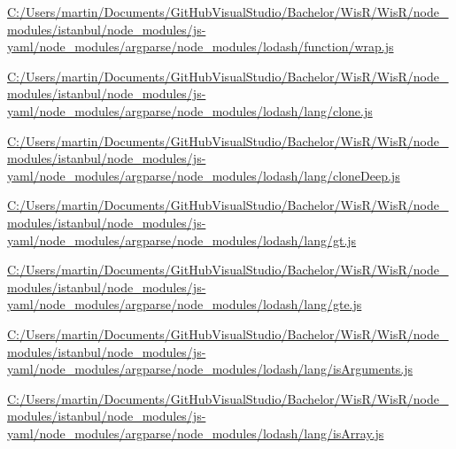 \begin{DoxyCompactItemize}
\item 
\hyperlink{_c_1_2_users_2martin_2_documents_2_git_hub_visual_studio_2_bachelor_2_wis_r_2_wis_r_2node_module78f187cbb354b52bc415f19efb84d83c}{C\+:/\+Users/martin/\+Documents/\+Git\+Hub\+Visual\+Studio/\+Bachelor/\+Wis\+R/\+Wis\+R/node\+\_\+modules/istanbul/node\+\_\+modules/js-\/yaml/node\+\_\+modules/argparse/node\+\_\+modules/lodash/function/wrap.\+js}
\item 
\hyperlink{_c_1_2_users_2martin_2_documents_2_git_hub_visual_studio_2_bachelor_2_wis_r_2_wis_r_2node_modulebd4a8145bed9da1f1f4712507570fd4c}{C\+:/\+Users/martin/\+Documents/\+Git\+Hub\+Visual\+Studio/\+Bachelor/\+Wis\+R/\+Wis\+R/node\+\_\+modules/istanbul/node\+\_\+modules/js-\/yaml/node\+\_\+modules/argparse/node\+\_\+modules/lodash/lang/clone.\+js}
\item 
\hyperlink{_c_1_2_users_2martin_2_documents_2_git_hub_visual_studio_2_bachelor_2_wis_r_2_wis_r_2node_modulefd1acf0c48ee2a338bb1349107fbb9a1}{C\+:/\+Users/martin/\+Documents/\+Git\+Hub\+Visual\+Studio/\+Bachelor/\+Wis\+R/\+Wis\+R/node\+\_\+modules/istanbul/node\+\_\+modules/js-\/yaml/node\+\_\+modules/argparse/node\+\_\+modules/lodash/lang/clone\+Deep.\+js}
\item 
\hyperlink{_c_1_2_users_2martin_2_documents_2_git_hub_visual_studio_2_bachelor_2_wis_r_2_wis_r_2node_module264da62225d2a5ed5814648b89ed2255}{C\+:/\+Users/martin/\+Documents/\+Git\+Hub\+Visual\+Studio/\+Bachelor/\+Wis\+R/\+Wis\+R/node\+\_\+modules/istanbul/node\+\_\+modules/js-\/yaml/node\+\_\+modules/argparse/node\+\_\+modules/lodash/lang/gt.\+js}
\item 
\hyperlink{_c_1_2_users_2martin_2_documents_2_git_hub_visual_studio_2_bachelor_2_wis_r_2_wis_r_2node_modulef5abe034b9ab1fcf26552468791610d6}{C\+:/\+Users/martin/\+Documents/\+Git\+Hub\+Visual\+Studio/\+Bachelor/\+Wis\+R/\+Wis\+R/node\+\_\+modules/istanbul/node\+\_\+modules/js-\/yaml/node\+\_\+modules/argparse/node\+\_\+modules/lodash/lang/gte.\+js}
\item 
\hyperlink{_c_1_2_users_2martin_2_documents_2_git_hub_visual_studio_2_bachelor_2_wis_r_2_wis_r_2node_modulee8a43435dff201322bd451c9cbe6b122}{C\+:/\+Users/martin/\+Documents/\+Git\+Hub\+Visual\+Studio/\+Bachelor/\+Wis\+R/\+Wis\+R/node\+\_\+modules/istanbul/node\+\_\+modules/js-\/yaml/node\+\_\+modules/argparse/node\+\_\+modules/lodash/lang/is\+Arguments.\+js}
\item 
\hyperlink{_c_1_2_users_2martin_2_documents_2_git_hub_visual_studio_2_bachelor_2_wis_r_2_wis_r_2node_modulec35415e899e4ca274fae1b3e5877672b}{C\+:/\+Users/martin/\+Documents/\+Git\+Hub\+Visual\+Studio/\+Bachelor/\+Wis\+R/\+Wis\+R/node\+\_\+modules/istanbul/node\+\_\+modules/js-\/yaml/node\+\_\+modules/argparse/node\+\_\+modules/lodash/lang/is\+Array.\+js}

\end{DoxyCompactItemize}
